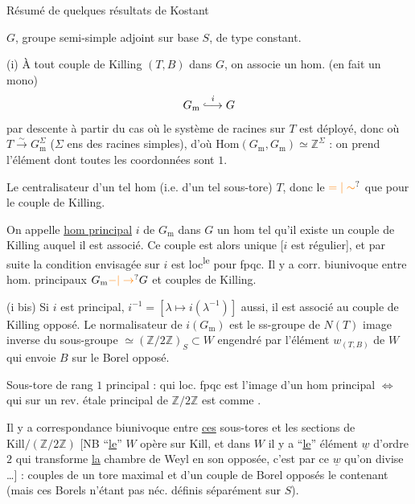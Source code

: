 Résumé de quelques résultats de Kostant

$G$, groupe semi-simple adjoint sur base $S$, de type constant.

(i) À tout couple de Killing $(T,B)$ dans $G$, on associe un hom. (en fait un mono)
\[
G_{\mathrm m}\overset{i}{\lhook\joinrel\longrightarrow}G
\]
par descente à partir du cas où le système de racines sur $T$ est déployé, donc où $T\xrightarrow{\sim}G_{\mathrm m}^{\Sigma}$ ($\Sigma$ ens des racines simples),  d'où $\mathrm{Hom}(G_{\mathrm m},G_{\mathrm m})\simeq\mathbb Z^{\Sigma}$ : on prend l'élément dont toutes les coordonnées sont $1$.

Le centralisateur d'un tel hom (i.e. d'un tel sous-tore)  $T$, donc le $\unsure{=|\sim}$ que pour le couple de Killing.

On appelle \uline{hom principal} $i$ de $G_{\mathrm m}$ dans $G$ un hom tel qu'il existe un couple de Killing auquel il est associé. Ce couple est alors unique [$i$ est régulier], et par suite la condition envisagée sur $i$ est loc\textsuperscript{le} pour fpqc. Il y a corr. biunivoque entre hom. principaux $G_{\mathrm m}\unsure{-|\to}G$ et couples de Killing.

(i bis)  Si $i$ est principal, $i^{-1}=[\lambda\mapsto i(\lambda^{-1})]$ aussi, il est associé au couple de Killing opposé. Le normalisateur de $i(G_{\mathrm m})$ est le ss-groupe de $N(T)$ image inverse du sous-groupe $\simeq(\mathbb Z/2\mathbb Z)_S\subset W$ engendré par l'élément $w_{(T,B)}$ de $W$ qui envoie $B$ sur le Borel opposé.

Sous-tore de rang $1$ principal : qui loc. fpqc est l'image d'un hom principal $\Longleftrightarrow$ qui sur un rev. étale  principal de  $\mathbb Z/2\mathbb Z$ est comme .

Il y a correspondance biunivoque entre \uline{ces} sous-tores et les sections de $\mathrm{Kill}/(\mathbb Z/2\mathbb Z)$ [NB ``\uline{le}'' $W$ opère sur $\mathrm{Kill}$, et dans $W$ il y a ``\uline{le}'' élément $\underline w$ d'ordre $2$ qui transforme \uline{la}  chambre de Weyl en son opposée, c'est par ce $\underline w$ qu'on divise \ldots] : couples de un tore maximal et d'un couple de Borel opposés le contenant (mais ces Borels n'étant pas néc. définis séparément sur $S$).

